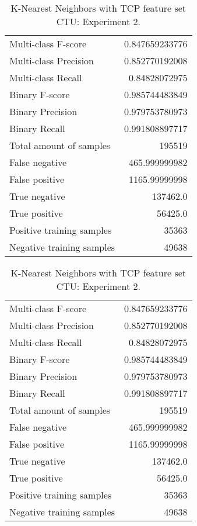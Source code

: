 \begin{table}[H]
\begin{minipage}{0.5\textwidth}
\caption{K-Nearest Neighbors with TCP feature set CTU: Experiment 1.}
\centering
\begin{tabular}{l r}
\toprule
Multi-class F-score & 0.847659233776 \\
Multi-class Precision & 0.852770192008 \\
Multi-class Recall & 0.84828072975 \\
\midrule
Binary F-score & 0.985744483849 \\
Binary Precision & 0.979753780973 \\
Binary Recall & 0.991808897717 \\
\midrule
Total amount of samples & 195519 \\
False negative & 465.999999982 \\
False positive & 1165.99999998 \\
True negative & 137462.0 \\
True positive & 56425.0 \\
\midrule
Positive training samples & 35363 \\
Negative training samples & 49638 \\
\bottomrule
\end{tabular}
\end{minipage}
\hfillx
\begin{minipage}{0.5\textwidth}
\caption{K-Nearest Neighbors with TCP feature set CTU: Experiment 2.}
\centering
\begin{tabular}{l r}
\toprule
Multi-class F-score & 0.847659233776 \\
Multi-class Precision & 0.852770192008 \\
Multi-class Recall & 0.84828072975 \\
\midrule
Binary F-score & 0.985744483849 \\
Binary Precision & 0.979753780973 \\
Binary Recall & 0.991808897717 \\
\midrule
Total amount of samples & 195519 \\
False negative & 465.999999982 \\
False positive & 1165.99999998 \\
True negative & 137462.0 \\
True positive & 56425.0 \\
\midrule
Positive training samples & 35363 \\
Negative training samples & 49638 \\
\bottomrule
\end{tabular}
\end{minipage}
\end{table}
